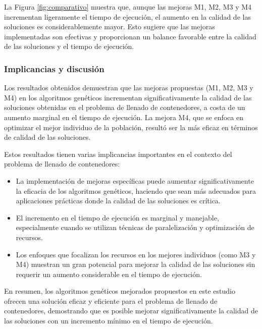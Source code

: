 La Figura \ref{fig:comparativo} muestra que, aunque las mejoras M1, M2, M3 y M4 incrementan ligeramente el tiempo de ejecución, el aumento en la calidad de las soluciones es considerablemente mayor. Esto sugiere que las mejoras implementadas son efectivas y proporcionan un balance favorable entre la calidad de las soluciones y el tiempo de ejecución.

\subsubsection{Implicancias y discusión}

Los resultados obtenidos demuestran que las mejoras propuestas (M1, M2, M3 y M4) en los algoritmos genéticos incrementan significativamente la calidad de las soluciones obtenidas en el problema de llenado de contenedores, a costa de un aumento marginal en el tiempo de ejecución. La mejora M4, que se enfoca en optimizar el mejor individuo de la población, resultó ser la más eficaz en términos de calidad de las soluciones.

Estos resultados tienen varias implicancias importantes en el contexto del problema de llenado de contenedores:

\begin{itemize}
    \item La implementación de mejoras específicas puede aumentar significativamente la eficacia de los algoritmos genéticos, haciendo que sean más adecuados para aplicaciones prácticas donde la calidad de las soluciones es crítica.
    \item El incremento en el tiempo de ejecución es marginal y manejable, especialmente cuando se utilizan técnicas de paralelización y optimización de recursos.
    \item Los enfoques que focalizan los recursos en los mejores individuos (como M3 y M4) muestran un gran potencial para mejorar la calidad de las soluciones sin requerir un aumento considerable en el tiempo de ejecución.
\end{itemize}

En resumen, los algoritmos genéticos mejorados propuestos en este estudio ofrecen una solución eficaz y eficiente para el problema de llenado de contenedores, demostrando que es posible mejorar significativamente la calidad de las soluciones con un incremento mínimo en el tiempo de ejecución.
